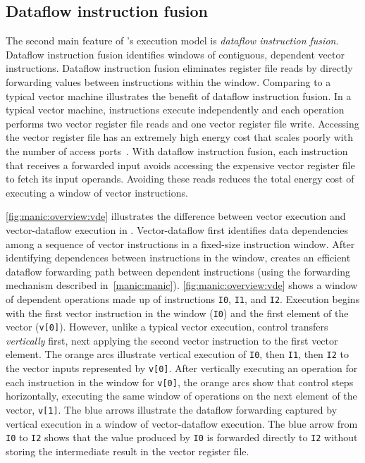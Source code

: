 \subsection{Dataflow instruction fusion}
The second main feature of \manic's execution model is {\em dataflow
instruction fusion}. Dataflow instruction fusion identifies windows of
contiguous, dependent vector instructions. 
%
Dataflow instruction fusion eliminates register file reads by directly
forwarding values between instructions within the window.
%
Comparing to a typical vector machine illustrates the benefit of dataflow
instruction fusion.  In a typical vector machine, instructions execute
independently and each operation performs two vector register file reads
and one vector register file write.
%
Accessing the vector register file has an extremely high energy cost that
scales poorly with the number of access ports~\cite{balfour_elm_thesis,kozyrakis2003overcoming}.  
%
With dataflow instruction fusion, each instruction that receives a forwarded
input avoids accessing the expensive vector register file to fetch its input
operands.  Avoiding these reads reduces the total energy cost of executing a
window of vector instructions.

\autoref{fig:manic:overview:vde} illustrates the difference between vector execution
and vector-dataflow execution in \manic.
%
Vector-dataflow first identifies data dependencies among a sequence of vector
instructions in a fixed-size instruction window.
%
After identifying dependences between instructions in the window, \manic
creates an efficient dataflow forwarding path between dependent instructions
(using the forwarding mechanism described in~\autoref{manic:manic}).
\autoref{fig:manic:overview:vde} shows a window of dependent operations made up of
instructions {\tt I0}, {\tt I1}, and {\tt I2}. 
%
Execution begins with the first vector instruction in the window ({\tt I0}) and the first
element of the vector ({\tt v[0]}).
%
However, unlike a typical vector execution, control transfers {\em vertically}
first, next applying the second vector instruction to the first
vector element. The orange arcs illustrate vertical execution of {\tt I0}, then
{\tt I1}, then {\tt I2} to the vector inputs represented by {\tt v[0]}.
%
After vertically executing an operation for each instruction in the window for
\texttt{v[0]}, the orange arcs show that control steps
horizontally, executing the same window of operations on the next element of
the vector, {\tt v[1]}.  
%
The blue arrows illustrate the dataflow forwarding captured by vertical
execution in a window of vector-dataflow execution.
%
The blue arrow from \texttt{I0} to \texttt{I2} shows that the value produced by
\texttt{I0} is forwarded directly to \texttt{I2} without storing the
intermediate result in the vector register file.



